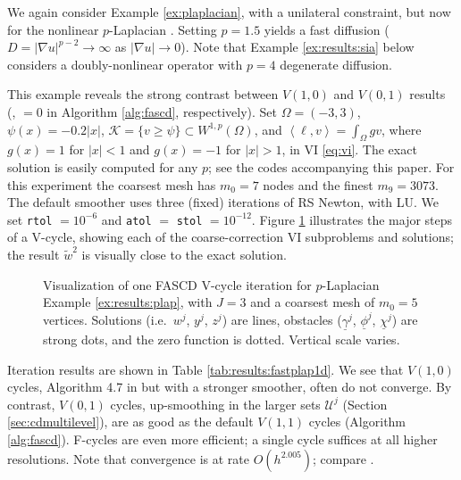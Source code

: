 \documentclass[review,hidelinks,onefignum,onetabnum]{siamart220329}
\newcommand{\grad}{\nabla}
\newcommand{\ip}[2]{\left<#1,#2\right>}
\begin{document}
\begin{example}  \label{ex:results:plap}
We again consider Example \ref{ex:plaplacian}, with a unilateral constraint, but now for the nonlinear $p$-Laplacian \cite{ChoeLewis1991}.  Setting $p=1.5$ yields a fast diffusion ($D=|\grad u|^{p-2}\to \infty$ as $|\grad u|\to 0$).  Note that Example \ref{ex:results:sia} below considers a doubly-nonlinear operator with $p=4$ degenerate diffusion.

This example reveals the strong contrast between $V(1,0)$ and $V(0,1)$ results (,  $=0$ in Algorithm \ref{alg:fascd}, respectively).  Set $\Omega=(-3,3)$, $\psi(x) = -0.2|x|$, $\mathcal{K} = \{v \ge \psi\} \subset W^{1,p}(\Omega)$, and $\ip\ell v = \int_\Omega g v$, where $g(x)=1$ for $|x|<1$ and $g(x)=-1$ for $|x|>1$, in VI \eqref{eq:vi}.  The exact solution is easily computed for any $p$; see the codes accompanying this paper.  For this experiment the coarsest mesh has $m_0=7$ nodes and the finest $m_9=3073$.  The default smoother uses three (fixed) iterations of RS Newton, with LU.  We set \texttt{rtol} $= 10^{-6}$ and \texttt{atol} $=$ \texttt{stol} $= 10^{-12}$.  Figure \ref{fig:imagesvcycle} illustrates the major steps of a V-cycle, showing each of the coarse-correction VI subproblems and solutions; the result $\tilde w^2$ is visually close to the exact solution.

\begin{figure}[ht]
\centering

\caption{Visualization of one FASCD V-cycle iteration for $p$-Laplacian Example \ref{ex:results:plap}, with $J=3$ and a coarsest mesh of $m_0=5$ vertices.  Solutions (i.e.~$w^j$, $y^j$, $z^j$) are lines, obstacles ($\underline{\gamma}^j$, $\underline{\phi}^j$, $\underline{\chi}^j$) are strong dots, and the zero function is dotted.  Vertical scale varies.}
\label{fig:imagesvcycle}
\end{figure}

Iteration results are shown in Table \ref{tab:results:fastplap1d}.  We see that $V(1,0)$ cycles, Algorithm 4.7 in \cite{GraeserKornhuber2009} but with a stronger smoother, often do not converge.  By contrast, $V(0,1)$ cycles, up-smoothing in the larger sets $\mathcal{U}^j$ (Section \ref{sec:cdmultilevel}), are as good as the default $V(1,1)$ cycles (Algorithm \ref{alg:fascd}).  F-cycles are even more efficient; a single cycle suffices at all higher resolutions.   Note that convergence is at rate $O(h^{2.005})$; compare \cite{ChoeLewis1991}.
\end{example}
\end{document}
